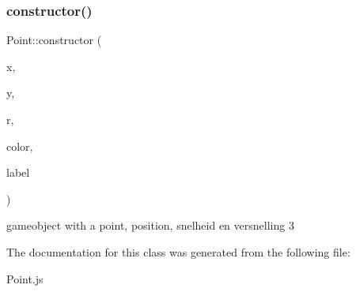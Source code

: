 \subsubsection{\texorpdfstring{constructor()}{constructor()}}
{\footnotesize\ttfamily Point\+::constructor (\begin{DoxyParamCaption}\item[{}]{x,  }\item[{}]{y,  }\item[{}]{r,  }\item[{}]{color,  }\item[{}]{label }\end{DoxyParamCaption})\hspace{0.3cm}{\ttfamily [inline]}}

gameobject with a point, position, snelheid en versnelling 3 

The documentation for this class was generated from the following file\+:\begin{DoxyCompactItemize}
\item 
Point.\+js\end{DoxyCompactItemize}
